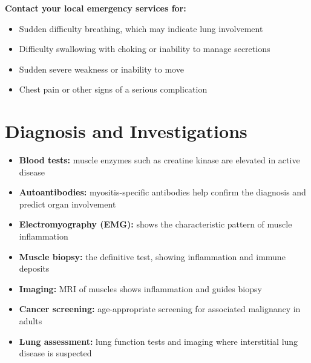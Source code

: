 \textbf{Contact your local emergency services for:}
\begin{itemize}
    \item Sudden difficulty breathing, which may indicate lung involvement
    \item Difficulty swallowing with choking or inability to manage secretions
    \item Sudden severe weakness or inability to move
    \item Chest pain or other signs of a serious complication
\end{itemize}

\section*{Diagnosis and Investigations}
\begin{itemize}
    \item \textbf{Blood tests:} muscle enzymes such as creatine kinase are elevated in active disease
    \item \textbf{Autoantibodies:} myositis-specific antibodies help confirm the diagnosis and predict organ involvement
    \item \textbf{Electromyography (EMG):} shows the characteristic pattern of muscle inflammation
    \item \textbf{Muscle biopsy:} the definitive test, showing inflammation and immune deposits
    \item \textbf{Imaging:} MRI of muscles shows inflammation and guides biopsy
    \item \textbf{Cancer screening:} age-appropriate screening for associated malignancy in adults
    \item \textbf{Lung assessment:} lung function tests and imaging where interstitial lung disease is suspected
\end{itemize}

